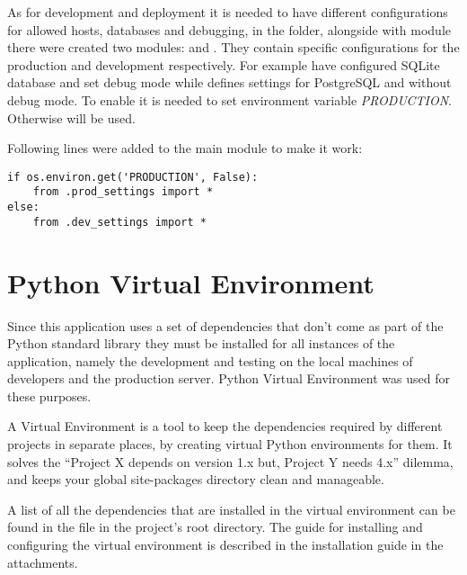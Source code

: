As for development and deployment it is needed to have different configurations for allowed hosts, databases and debugging, in the  folder, alongside with  module there were created two modules:  and . They contain specific configurations for the production and development respectively. For example  have configured SQLite database and set debug mode while  defines settings for PostgreSQL and without debug mode. To enable  it is needed to set environment variable \textit{PRODUCTION}. Otherwise  will be used.

Following lines were added to the main  module to make it work:

\begin{lstlisting}
if os.environ.get('PRODUCTION', False):
    from .prod_settings import *
else:
    from .dev_settings import *
\end{lstlisting}



\section{Python Virtual Environment}
Since this application uses a set of dependencies that don’t come as part of the Python standard library they must be installed for all instances of the application, namely the development and testing on the local machines of developers and the production server. Python Virtual Environment was used for these purposes.

A Virtual Environment is a tool to keep the dependencies required by different projects in separate places, by creating virtual Python environments for them. It solves the “Project X depends on version 1.x but, Project Y needs 4.x” dilemma, and keeps your global site-packages directory clean and manageable.\cite{pythonvenv}

A list of all the dependencies that are installed in the virtual environment can be found in the  file in the project's root directory. The guide for installing and configuring the virtual environment is described in the installation guide in the attachments.
